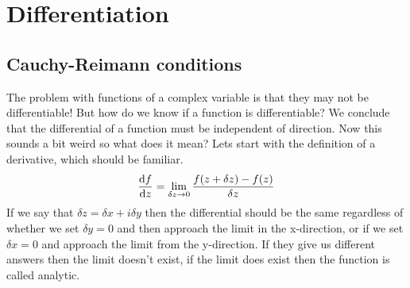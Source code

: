 \section{Differentiation}
\subsection{Cauchy-Reimann conditions}
The problem with functions of a complex variable is that they may not be differentiable!
 But how do we know if a function is differentiable? 
 We conclude that the differential of a function must be independent of direction. 
 Now this sounds a bit weird so what does it mean?
  Lets start with the definition of a derivative, which should be familiar.
%
\begin{equation*}
\frac{\mathop{}\!\mathrm{d} f}{\mathop{}\!\mathrm{d} z}=\lim_{\delta z\to 0}\frac{f(z+\delta z)-f(z)}{\delta z}
\end{equation*}
%
If we say that $\delta z=\delta x + i\delta y$ then the differential should be the same regardless of whether we set $\delta y=0$ and then approach the limit in the x-direction, or if we set $\delta x=0$ and approach the limit from the y-direction.
 If they give us different answers then the limit doesn't exist, if the limit does exist then the function is called analytic.
 
